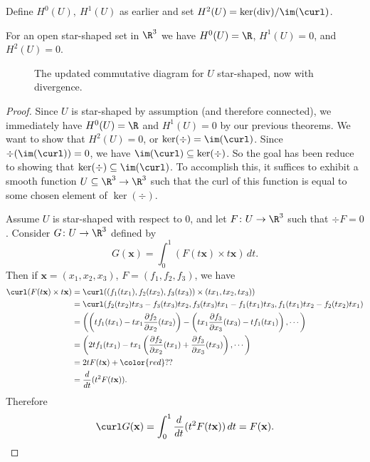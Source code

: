 Define $H^0(U),\ H^1(U)$ as earlier and set $H^2(U)=\ker (\operatorname{div}) / \im (\curl)$. 
\begin{theorem}
    For an open star-shaped set in $\R^3$ we have $H^0(U)=\R$, $H^1(U)=0$, and $H^2(U)=0$.
\end{theorem}
\begin{figure}[H]
\centering
{}
\caption{The updated commutative diagram for $U$ star-shaped, now with divergence.} 
\end{figure}
\begin{proof}
    Since $U$ is star-shaped by assumption (and therefore connected), we immediately have $H^0(U)=\R$ and $H^1(U)=0$ by our previous theorems. We want to show that $H^2(U)=0$, or $\ker(\div)=\im(\curl)$. Since $\div(\im(\curl))=0$, we have $\im (\curl) \subseteq \ker(\div)$. So the goal has been reduce to showing that $\ker(\div) \subseteq \im(\curl)$. To accomplish this, it suffices to exhibit a smooth function $U\subseteq \R^3\to \R^3$ such that the curl of this function is equal to some chosen element of $\ker(\div) .$

    Assume $U$ is star-shaped with respect to 0, and let $F \colon U \to\R^3$ such that $\div F=0$. Consider $G \colon U \to \R^3$ defined by \[
        G(\mathbf x)= \int_{0}^{1} (F(t\mathbf x)\times t\mathbf x) \, dt.
    \] Then if $\mathbf x=(x_1,x_2,x_3)$, $F=(f_1,f_2,f_3)$, we have
    \begin{align*}
        \curl(F(t\mathbf x)\times t\mathbf x)&=\curl((f_1(tx_1),f_2(tx_2),f_3(tx_3))\times (tx_1,tx_2,tx_3))\\
                                             &=\curl (f_2(tx_2)tx_3-f_3(tx_3)tx_2,f_3(tx_3)tx_1-f_1(tx_1)tx_3,f_1(tx_1)tx_2-f_2(tx_2)tx_1)\\
                                             &=\left( \left( tf_1(tx_1) -tx_1\frac{\partial f_2}{\partial x_2}(tx_2)\right) -\left( tx_1 \frac{\partial f_3}{\partial x_3}(tx_3)-tf_1(tx_1) \right) ,\cdots \right) \\
                                             &=\left( 2tf_1(tx_1)-tx_1\left( \frac{\partial f_2}{\partial x_2}(tx_1)+\frac{\partial f_3}{\partial x_3}(tx_3) \right)  ,\cdots \right) \\
                                             &=2t F(t\mathbf x)+{\color{red}??} \\
                                             &=\frac{d}{dt}(t^2 F(t\mathbf x)).
    \end{align*}
Therefore \[
    \curl G(\mathbf x)=\int_{0}^{1} \frac{d}{dt}(t^2F(t\mathbf x)) \, dt=F(\mathbf x).\qedhere
\] 
\end{proof}
